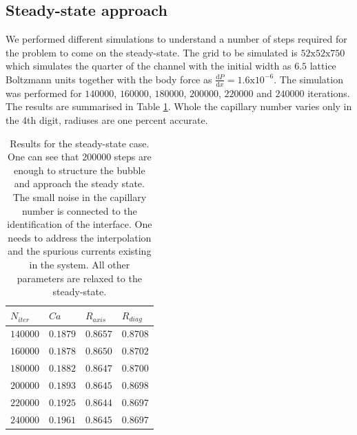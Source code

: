\documentclass{article}
\begin{document}
\subsection{Steady-state approach}
We performed different simulations to understand a number of steps required for the problem to come
on the steady-state. The grid to be simulated is $52\mathrm{x}52\mathrm{x}750$ which simulates the
quarter of the channel with the initial
width as $6.5$ lattice Boltzmann units together with the body force as
$\frac{\mathrm{d}P}{\mathrm{d}x}=1.6
\mathrm{x}10^{-6}$. The simulation was performed for $140000$, $160000$, $180000$, $200000$,
$220000$ and
$240000$ iterations. The results are summarised in Table \ref{table:steady:state}. Whole the
capillary number varies only in the 4th digit, radiuses are one percent accurate. 
\begin{table}
\begin{tabularx}{\textwidth}{|X|X|X|X|}
\hline
$N_{iter}$&$Ca$&$R_{axis}$&$R_{diag}$\\
\hline
$140000$&$0.1879$&$0.8657$&$0.8708$\\
$160000$&$0.1878$&$0.8650$&$0.8702$\\
$180000$&$0.1882$&$0.8647$&$0.8700$\\
$200000$&$0.1893$&$0.8645$&$0.8698$\\
$220000$&$0.1925$&$0.8644$&$0.8697$\\
$240000$&$0.1961$&$0.8645$&$0.8697$\\
\hline
\end{tabularx}
\caption{Results for the steady-state case. One
can see that $200000$ steps are enough to structure
the bubble and approach the steady state. The small noise in the capillary number is connected to
the identification of the interface. One needs to address the interpolation and the spurious
currents existing in the system. All other parameters are relaxed to the
steady-state.\label{table:steady:state}}
\end{table}
\end{document}
